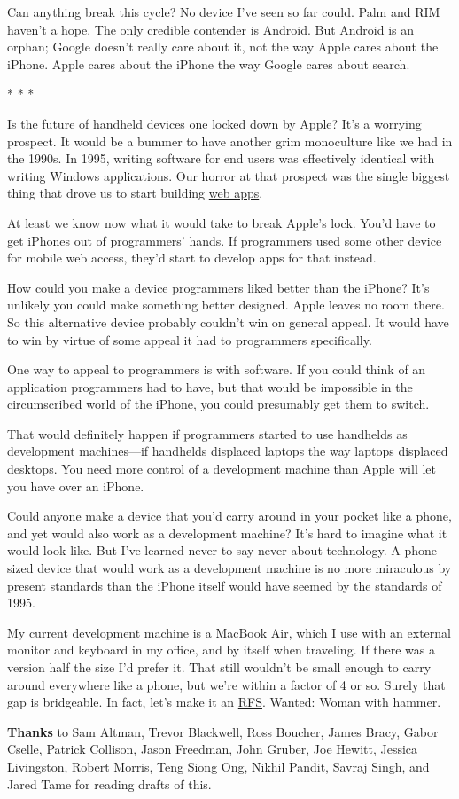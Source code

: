 Can anything break this cycle? No device I've seen so far could. Palm
and RIM haven't a hope. The only credible contender is Android. But
Android is an orphan; Google doesn't really care about it, not the way
Apple cares about the iPhone. Apple cares about the iPhone the way
Google cares about search.

* * *

Is the future of handheld devices one locked down by Apple? It's a
worrying prospect. It would be a bummer to have another grim monoculture
like we had in the 1990s. In 1995, writing software for end users was
effectively identical with writing Windows applications. Our horror at
that prospect was the single biggest thing that drove us to start
building \href{road.html}{web apps}.

At least we know now what it would take to break Apple's lock. You'd
have to get iPhones out of programmers' hands. If programmers used some
other device for mobile web access, they'd start to develop apps for
that instead.

How could you make a device programmers liked better than the iPhone?
It's unlikely you could make something better designed. Apple leaves no
room there. So this alternative device probably couldn't win on general
appeal. It would have to win by virtue of some appeal it had to
programmers specifically.

One way to appeal to programmers is with software. If you could think of
an application programmers had to have, but that would be impossible in
the circumscribed world of the iPhone, you could presumably get them to
switch.

That would definitely happen if programmers started to use handhelds as
development machines---if handhelds displaced laptops the way laptops
displaced desktops. You need more control of a development machine than
Apple will let you have over an iPhone.

Could anyone make a device that you'd carry around in your pocket like a
phone, and yet would also work as a development machine? It's hard to
imagine what it would look like. But I've learned never to say never
about technology. A phone-sized device that would work as a development
machine is no more miraculous by present standards than the iPhone
itself would have seemed by the standards of 1995.

My current development machine is a MacBook Air, which I use with an
external monitor and keyboard in my office, and by itself when
traveling. If there was a version half the size I'd prefer it. That
still wouldn't be small enough to carry around everywhere like a phone,
but we're within a factor of 4 or so. Surely that gap is bridgeable. In
fact, let's make it an \href{http://ycombinator.com/rfs5.html}{RFS}.
Wanted: Woman with hammer.


\textbf{Thanks} to Sam Altman, Trevor Blackwell, Ross Boucher, James
Bracy, Gabor Cselle, Patrick Collison, Jason Freedman, John Gruber, Joe
Hewitt, Jessica Livingston, Robert Morris, Teng Siong Ong, Nikhil
Pandit, Savraj Singh, and Jared Tame for reading drafts of this.
